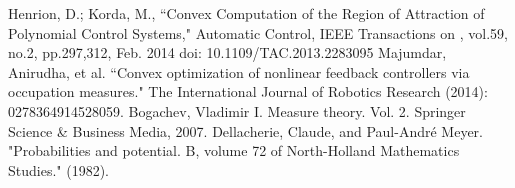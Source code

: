 \documentclass[dvipsnames]{article}
\begin{document}
\begin{thebibliography}{9}
  Henrion, D.; Korda, M., ``Convex Computation of the Region of Attraction of Polynomial Control Systems," Automatic Control, IEEE Transactions on , vol.59, no.2, pp.297,312, Feb. 2014
    doi: 10.1109/TAC.2013.2283095
Majumdar, Anirudha, et al. ``Convex optimization of nonlinear feedback controllers via occupation measures." The International Journal of Robotics Research (2014): 0278364914528059.
Bogachev, Vladimir I. Measure theory. Vol. 2. Springer Science \& Business Media, 2007.
Dellacherie, Claude, and Paul-André Meyer. "Probabilities and potential. B, volume 72 of North-Holland Mathematics Studies." (1982).
\end{thebibliography}
\end{document}
